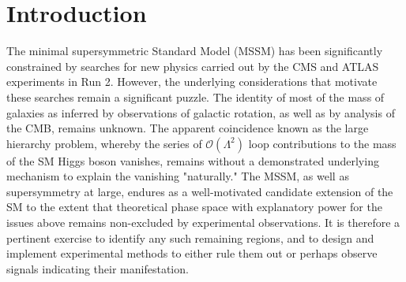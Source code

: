 \clearpage
\section{Introduction}
\label{sec:search-introduction}

The minimal supersymmetric Standard Model (MSSM) has been significantly constrained by searches for new physics carried out by the CMS and ATLAS experiments in Run 2. However, the underlying considerations that motivate these searches remain a significant puzzle. The identity of most of the mass of galaxies as inferred by observations of galactic rotation, as well as by analysis of the CMB, remains unknown. The apparent coincidence known as the large hierarchy problem, whereby the series of $\mathcal{O}(\Lambda^2)$ loop contributions to the mass of the SM Higgs boson vanishes, remains without a demonstrated underlying mechanism to explain the vanishing "naturally." The MSSM, as well as supersymmetry at large, endures as a well-motivated candidate extension of the SM to the extent that theoretical phase space with explanatory power for the issues above remains non-excluded by experimental observations. It is therefore a pertinent exercise to identify any such remaining regions, and to design and implement experimental methods to either rule them out or perhaps observe signals indicating their manifestation. 

